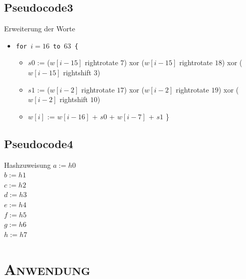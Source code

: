 \documentclass[xcolor=x11names,compress]{beamer}
\renewcommand{\(}{\begin{columns}}
\renewcommand{\)}{\end{columns}}
\newcommand{\<}[1]{\begin{column}{#1}}
\renewcommand{\>}{\end{column}}
\begin{document}
\subsection{Pseudocode3}
\begin{frame}{Erweiterung der Worte}

\begin{itemize}

\item 
\texttt{for $i=16$ to $63$ \{}
		 \begin{itemize}
		 \item $s0$ := ($w[i-15]$ rightrotate $7$) xor ($w[i-15]$ rightrotate $18$) xor ($w[i-15]$ rightshift $3$) \newline
        \item $s1$ := ($w[i-2]$ rightrotate $17$) xor ($w[i-2]$ rightrotate $19$) xor ($w[i-2]$ rightshift $10$) \newline
        \item $w[i]$ := $w[i-16]$ + $s0$ + $w[i-7]$ + $s1$ \newline \}
		 \end{itemize}
         
\end{itemize}


\end{frame}
\subsection{Pseudocode4}
\begin{frame}{Hashzuweisung}
\texttt{$a := h0$ \\
    $b := h1$ \\
    $c := h2$ \\
    $d := h3$ \\
    $e := h4$ \\
    $f := h5$ \\
    $g := h6$ \\
    $h := h7$} 

\end{frame}
\section{\scshape Anwendung}
\end{document}
